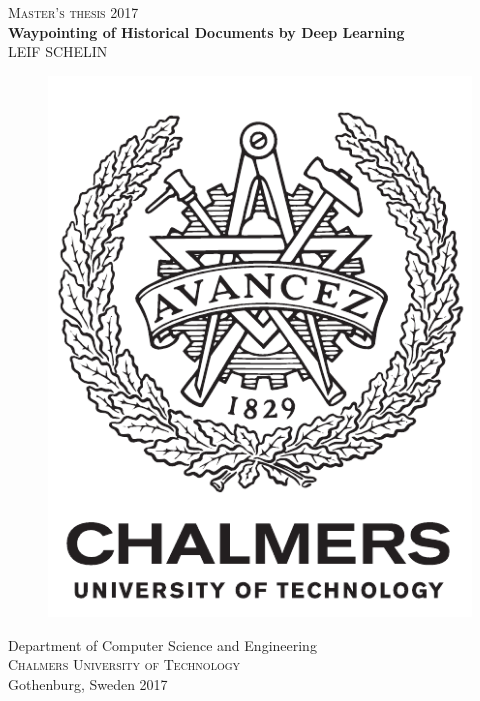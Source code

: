 \newpage
\thispagestyle{empty}
\begin{center}
	\textsc{\large Master's thesis 2017}\\[4cm]		%
	\textbf{\Large Waypointing of Historical Documents by Deep Learning
	} \\[1cm]
	{\large LEIF SCHELIN}
	
	\vfill	
	\begin{figure}[H]
	\centering
	\includegraphics[width=0.4\pdfpagewidth]{figures/auxiliary/logo_eng.pdf}
	\end{figure}	\vspace{5mm}	
	
	Department of Computer Science and Engineering\\
	\textsc{Chalmers University of Technology} \\
	Gothenburg, Sweden 2017 \\
\end{center}


